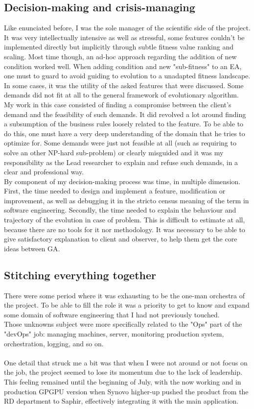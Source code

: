 \documentclass[12pt]{memoir}
\begin{document}
\subsection{Decision-making and crisis-managing}
Like enunciated before, I was the sole manager of the scientific side of the project.
It was very intellectually intensive as well as stressful, some features couldn't be
implemented directly but implicitly through subtle fitness value ranking and
scaling. Most time though, an ad-hoc approach regarding the addition of new condition
worked well. When adding condition and new "sub-fitness" to an EA, one must to guard to
avoid guiding to evolution to a unadapted fitness landscape. \\
In some cases, it was the utility of the asked features that were discussed. Some demands
did not fit at all to the general framework of evolutionary algorithm. My work in this
case consisted of finding a compromise between the client's demand and the feasibility
of such demands. It did revolved a lot around finding a subsumption of the business
rules loosely related to the feature. To be able to do this, one must have a very deep
understanding of the domain that he tries to optimize for. Some demands were just not
feasible at all (such as requiring to solve an other NP-hard sub-problem) or clearly
misguided and it was my responsibility as the Lead researcher to explain and refuse
such demands, in a clear and professional way.\\
By component of my decision-making process was time, in multiple dimension. First, the time
needed to design and implement a feature, modification or improvement, as well as
debugging it in the stricto census meaning of the term in software engineering. Secondly,
the time needed to explain the behaviour and trajectory of the evolution in case of problem.
This is difficult to estimate at all, because there are no tools for it nor methodology.
It was necessary to be able to give satisfactory explanation to client and observer,
to help them get the core ideas between GA.

\subsection{Stitching everything together}
There were some period where it was exhausting to be the one-man orchestra of the project.
To be able to fill the role it was a priority to get to know and expand some domain of
software engineering that I had not previously touched. \\
Those unknowns subject were more specifically related to the "Ops" part of the "devOps"
job: managing machines, server, monitoring production system, orchestration, logging, and so on.\\
\\
One detail that struck me a bit was that when I were not around or not focus on the job,
the project seemed to lose its momentum due to the lack of leadership. This feeling
remained until the beginning of July, with the now working and in production GPGPU
version when Synovo higher-up pushed the product from the RD department to Saphir,
effectively integrating it with the main application.
\end{document}
